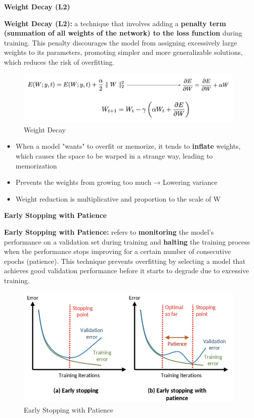 \noindent\textbf{Weight Decay (L2)}
\begin{definition}
    \textbf{Weight Decay (L2):} a technique that involves adding a \textbf{penalty term (summation of all weights of the network) to the loss function} during training. This penalty discourages the model from assigning excessively large weights to its parameters, promoting simpler and more generalizable solutions, which reduces the risk of overfitting.
\end{definition}

\begin{figure}[h!t]
    \centering
    \includegraphics[width=0.75\linewidth]{weightdecay.png}
    \caption{Weight Decay}
    \label{fig:enter-label}
\end{figure}

\begin{itemize}
    \item When a model "wants" to overfit or memorize, it tends to \textbf{inflate} weights, which causes the space to be warped in a strange way, leading to memorization
    \item Prevents the weights from growing too much → Lowering variance
    \item Weight reduction is multiplicative and proportion to the scale of W
\end{itemize}

\noindent\textbf{Early Stopping with Patience}
\begin{definition}
    \textbf{Early Stopping with Patience:} refers to \textbf{monitoring} the model's performance on a validation set during training and \textbf{halting} the training process when the performance stops improving for a certain number of consecutive epochs (patience). This technique prevents overfitting by selecting a model that achieves good validation performance before it starts to degrade due to excessive training.
\end{definition}

\begin{figure}[h!t]
    \centering
    \includegraphics[width=0.75\linewidth]{earlystopping.png}
    \caption{Early Stopping with Patience}
    \label{fig:enter-label}
\end{figure}

